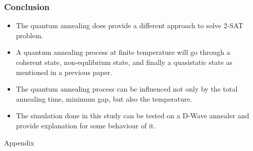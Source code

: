 \documentclass{beamer}
\begin{document}
\begin{frame}
	\frametitle{Conclusion}
	\begin{itemize}
		\item The quantum annealing does provide a different approach to solve 2-SAT problem.
		\item A quantum annealing process at finite temperature will go through a coherent state, non-equlibrium state, and finally a quasistatic state as mentioned in a previous paper.
		\item The quantum annealing process can be influenced not only by the total annealing time, minimum gap, but also the temperature.
		\item The simulation done in this study can be tested on a D-Wave annealer and provide explanation for some behaviour of it.
	\end{itemize}
\end{frame}

\appendix

\mode*

\begin{frame}
	\centering
	Appendix
\end{frame}
\end{document}
